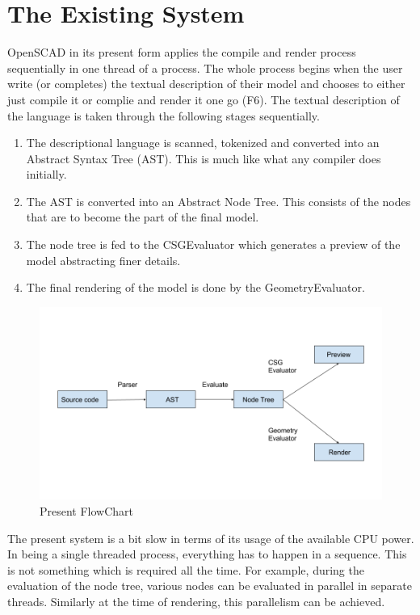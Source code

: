 \section{The Existing System}
OpenSCAD in its present form applies the compile and render process sequentially in one thread of a process. The whole process begins when the user write (or completes) the textual description of their model and chooses to either just compile it or complie and render it one go (F6). The textual description of the language is taken through the following stages sequentially.
\begin{enumerate}
	\item The descriptional language is scanned, tokenized and converted into an Abstract Syntax Tree (AST). This is much like what any compiler does initially.
	\item The AST is converted into an Abstract Node Tree. This consists of the nodes that are to become the part of the final model.
	\item The node tree is fed to the CSGEvaluator which generates a preview of the model abstracting finer details.
	\item The final rendering of the model is done by the GeometryEvaluator.
\end{enumerate}

\begin{figure}
\centering
\includegraphics[width=\linewidth]{images/flowchart}
\caption{Present FlowChart}
\label{fig:flowchart}
\end{figure}

The present system is a bit slow in terms of its usage of the available CPU power. In being a single threaded process, everything has to happen in a sequence. This is not something which is required all the time. For example, during the evaluation of the node tree, various nodes can be evaluated in parallel in separate threads. Similarly at the time of rendering, this parallelism can be achieved.

